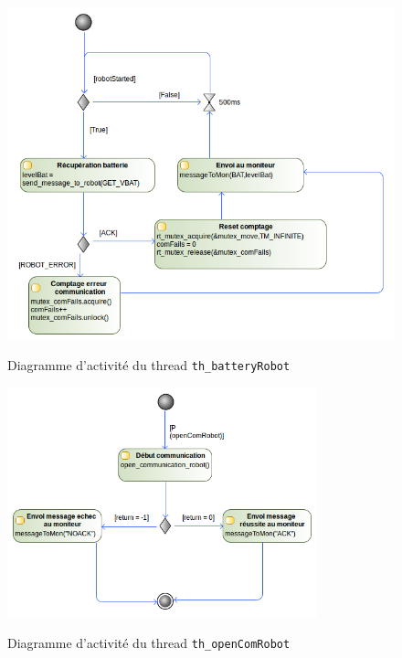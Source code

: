 \documentclass[11pt, a4paper]{paper}
\begin{document}
\begin{figure}[H]
\label{fig:th_batteryRobot}
\begin{center}
{\includegraphics[width=1.0\textwidth]{./figures-pdf/th_batteryRobot}}
{\caption{Diagramme d'activité du thread {\tt th\_batteryRobot}}}
\end{center}
\end{figure}

\begin{figure}[H]
\label{fig:th_openComRobot}
\begin{center}
{\includegraphics[width=0.8\textwidth]{./figures-pdf/th_openComRobot}}
{\caption{Diagramme d'activité du thread {\tt th\_openComRobot}}}
\end{center}
\end{figure}
\end{document}
